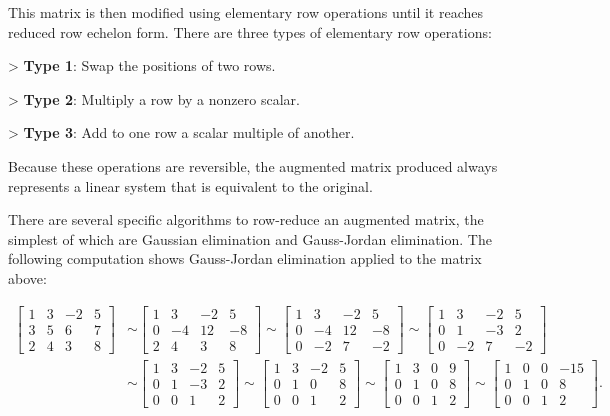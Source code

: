 This matrix is then modified using elementary row operations until it reaches reduced row
echelon form. There are three types of elementary row operations:



> \textbf{Type 1}: Swap the positions of two rows.

> \textbf{Type 2}: Multiply a row by a nonzero scalar.

> \textbf{Type 3}: Add to one row a scalar multiple of another.



Because these operations are reversible, the augmented matrix produced always represents a
linear system that is equivalent to the original.



There are several specific algorithms to row-reduce an augmented matrix, the simplest of
which are Gaussian elimination and Gauss-Jordan elimination. The following computation
shows Gauss-Jordan elimination applied to the matrix above:


\begin{align}
\left[\begin{array}{rrr|r}
1 & 3 & -2 & 5 \\
3 & 5 & 6 & 7 \\
2 & 4 & 3 & 8
\end{array}\right]
&\sim
\left[\begin{array}{rrr|r}
1 & 3 & -2 & 5 \\
0 & -4 & 12 & -8 \\
2 & 4 & 3 & 8
\end{array}\right]
\sim
\left[\begin{array}{rrr|r}
1 & 3 & -2 & 5 \\
0 & -4 & 12 & -8 \\
0 & -2 & 7 & -2
\end{array}\right]
\sim
\left[\begin{array}{rrr|r}
1 & 3 & -2 & 5 \\
0 & 1 & -3 & 2 \\
0 & -2 & 7 & -2
\end{array}\right] \\
&\sim
\left[\begin{array}{rrr|r}
1 & 3 & -2 & 5 \\
0 & 1 & -3 & 2 \\
0 & 0 & 1 & 2
\end{array}\right]
\sim
\left[\begin{array}{rrr|r}
1 & 3 & -2 & 5 \\
0 & 1 & 0 & 8 \\
0 & 0 & 1 & 2
\end{array}\right]
\sim
\left[\begin{array}{rrr|r}
1 & 3 & 0 & 9 \\
0 & 1 & 0 & 8 \\
0 & 0 & 1 & 2
\end{array}\right]
\sim
\left[\begin{array}{rrr|r}
1 & 0 & 0 & -15 \\
0 & 1 & 0 & 8 \\
0 & 0 & 1 & 2
\end{array}\right].
\end{align}

